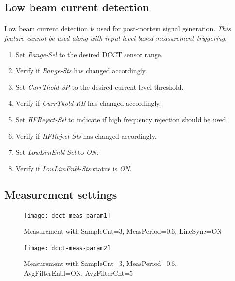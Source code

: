 \documentclass[openany]{article}
\begin{document}
	\subsection{Low beam current detection}

		\paragraph{} Low beam current detection is used for post-mortem signal generation. \emph{This feature cannot be used along with input-level-based measurement triggering}.

			\begin{enumerate}
				\item Set \emph{Range-Sel} to the desired DCCT sensor range.
				\item Verify if \emph{Range-Sts} has changed accordingly.
				\item Set \emph{CurrThold-SP} to the desired current level threshold.
				\item Verify if \emph{CurrThold-RB} has changed accordingly.
				\item Set \emph{HFReject-Sel} to indicate if high frequency rejection should be used.
				\item Verify if \emph{HFReject-Sts} has changed accordingly.
				\item Set \emph{LowLimEnbl-Sel} to \emph{ON}.
				\item Verify if \emph{LowLimEnbl-Sts} status is \emph{ON}.
			\end{enumerate}

	\subsection{Measurement settings}\label{measurement-settings}

		\begin{figure}[!h]
			\caption{Measurement with SampleCnt=3, MeasPeriod=0.6, LineSync=ON}
			\label{fig:meas-param1}
			\centering
			\texttt{[image: dcct-meas-param1]}
		\end{figure}

		\begin{figure}[!h]
			\caption{Measurement with SampleCnt=3, MeasPeriod=0.6, AvgFilterEnbl=ON, AvgFilterCnt=5}
			\label{fig:meas-param2}
			\centering
			\texttt{[image: dcct-meas-param2]}
		\end{figure}
\FloatBarrier
\end{document}

